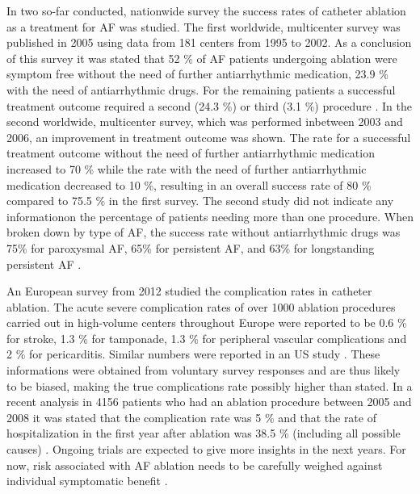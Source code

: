 \documentclass[type=dr, dr=rernat, accentcolor=tud7b,colorbacktitle, bigchapter, openright, twoside, 12pt ]{tudthesis}
\begin{document}
In two so-far conducted, nationwide survey the success rates of catheter ablation as a treatment 
for AF was studied. The first worldwide, multicenter survey was published in 2005 using data from 181 centers from 1995 to 2002. As a 
conclusion of this survey it was stated that 52 \% of AF patients undergoing ablation were symptom free without the need of further 
antiarrhythmic medication, 23.9 \% with the need of antiarrhythmic drugs. For the remaining patients a successful treatment outcome 
required a second (24.3 \%) or third (3.1 \%) procedure \cite{Cap05}. In the second worldwide, multicenter survey, which was performed 
inbetween 2003 and 2006, an improvement in treatment outcome was shown. The rate for a successful treatment outcome without the need of 
further antiarrhythmic medication increased to 70 \% while the rate with the need of further antiarrhythmic medication decreased to 10 \%, 
resulting in an overall success rate of 80 \% compared to 75.5 \% in the first survey. The second study did not indicate any informationon 
the percentage of patients needing more than one procedure. When broken down 
by type of AF, the success rate without antiarrhythmic drugs was 75\% for paroxysmal AF, 65\% for persistent AF, and 63\% for longstanding 
persistent AF \cite{Cap10} \cite{Sto}.\newline

An European survey from 2012 \cite{Arb12} studied the complication rates in catheter ablation. The acute severe complication rates of over 
1000 ablation procedures carried out in high-volume centers throughout Europe were reported to be 0.6 \% for stroke, 1.3 \% for tamponade, 
1.3 \% for peripheral vascular complications and 2 \% for pericarditis. Similar numbers were reported in an US study \cite{Hoy11} 
\cite{Cap10}. These informations were obtained from voluntary survey responses and are thus likely to be biased, making the true 
complications rate possibly higher than stated. In a recent analysis in 4156 patients who had an ablation procedure between 2005 and 2008 
it was stated that the complication rate was 5 \% and that the rate of hospitalization in the first year after ablation was 38.5 \% 
(including all possible causes) \cite{Sha12}. Ongoing trials are expected to give more insights in the next years. For now, risk 
associated with AF ablation needs to be carefully weighed against individual 
symptomatic benefit \cite{ESC12}. 
\end{document}
